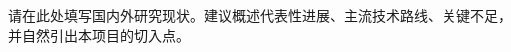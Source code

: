 \begin{GDNSFParagraphs}
请在此处填写国内外研究现状。建议概述代表性进展、主流技术路线、关键不足，并自然引出本项目的切入点。

\GDNSFBlankPara
\end{GDNSFParagraphs}
